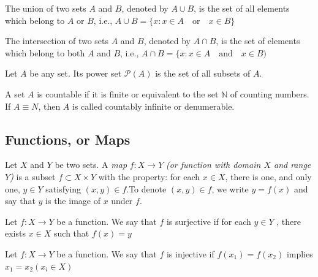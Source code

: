 \documentclass[12pt]{article} %
\begin{document}
\begin{definition}[Union]\parencite{lipschutz1965}
The union of two sets $A$ and $B$, denoted by $A\cup B$, is the set of all elements which belong to $A$ or $B$, i.e., $A\cup B = \{x:x\in A \quad \text{or} \quad x\in B\}$     
\end{definition}

\begin{definition}[Intersection]\parencite{lipschutz1965}
The intersection of two sets $A$ and $B$, denoted by $A\cap B$, is the set of elements which belong to both $A$ and $B$, i.e., $A\cap B=\{x:x\in A \quad \text{and} \quad x\in B)$   
\end{definition}


\begin{definition}\parencite{Dugundji1966}
Let $A$ be any set. Its power set $\mathcal{P}(A)$ is the set of all subsets of $A$.
\end{definition}

\begin{definition}[Countable]\parencite{Dugundji1966}
 A set $A$ is countable if it is finite or equivalent to the set $\mathbb{N}$ of counting
 numbers. If $A\equiv N$, then $A$ is called countably infinite or denumerable.
\end{definition}


\subsection{Functions, or Maps}

\begin{definition}[Map] \parencite{Dugundji1966}
Let $X$ and $Y$ be two sets. A \textit{map} $f: X \rightarrow Y$ \textit{(or function with domain $X$ and range $Y$)} is a subset $f\subset X \times Y$ with the property: for each $x\in X$, there is one, and only one, $y\in Y$ satisfying $(x,y)\in f$.To denote $(x,y)\in f$, we write $y=f(x)$ and say that $y$ is the image of $x$ under $f$.
\end{definition}



\begin{definition}\parencite{holmes_topology}
Let $f : X \to Y$ be a function. We say that $f$ is surjective if for each $y \in Y$ , there exists $x \in X$ such that $f(x) = y$
\end{definition}

\begin{definition}\parencite{holmes_topology}
Let $f : X \to Y$ be a function. We say that
$f$ is injective if $f(x_1) = f(x_2)$ implies $x_1 = x_2 (x_i \in X)$
\end{definition}
\end{document}
